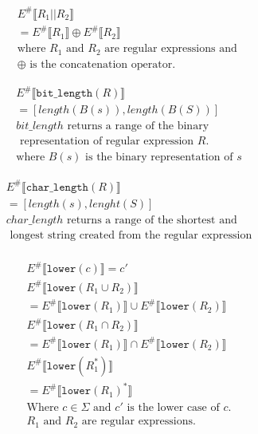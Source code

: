 \begin{align*}
    E^\# \llbracket R_1 \texttt{||} R_2 \rrbracket                          \\
    = E^\# \llbracket R_1 \rrbracket \oplus  E^\# \llbracket R_2 \rrbracket \\
    \text{where } R_1 \text{ and } R_2 \text{ are regular expressions and } \\
    \oplus \text{ is the concatenation operator.}
\end{align*}

\begin{align*}
    E^\# \llbracket \texttt{bit\_length} (R) \rrbracket \\
    =  [length(B(s)), length(B(S))]                     \\
    bit\_length \text{ returns a range of the binary}   \\
    \text{ representation of regular expression } R.    \\
    \text{where } B(s) \text{ is the binary representation of }s
\end{align*}

\begin{align*}
    E^\# \llbracket \texttt{char\_length} (R) \rrbracket       \\
    =  [length(s), lenght(S)]                                  \\
    char\_length \text{ returns a range of the shortest and}   \\
    \text{ longest string created from the regular expression} \\
\end{align*}

\begin{align*}
    E^\# \llbracket \texttt{lower} (c) \rrbracket =c'                                                    \\
    E^\# \llbracket \texttt{lower}(R_1 \cup R_2) \rrbracket                                              \\
    = E^\# \llbracket \texttt{lower}(R_1) \rrbracket \cup E^\# \llbracket \texttt{lower}(R_2) \rrbracket \\
    E^\# \llbracket \texttt{lower}(R_1 \cap R_2) \rrbracket                                              \\
    = E^\# \llbracket \texttt{lower}(R_1) \rrbracket \cap E^\# \llbracket \texttt{lower}(R_2) \rrbracket \\
    E^\# \llbracket \texttt{lower}(R_1^*) \rrbracket                                                     \\
    = E^\# \llbracket \texttt{lower}(R_1)^* \rrbracket                                                   \\
    \text{Where }c \in \Sigma \text{ and } c' \text{ is the lower case of } c.                           \\
    R_1 \text{ and } R_2 \text{ are regular expressions.}                                                \\
\end{align*}

